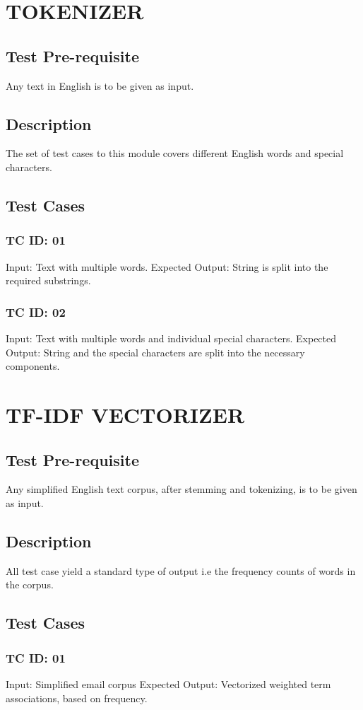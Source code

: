 \section{TOKENIZER}
\subsection{Test Pre-requisite} 
Any text in English is to be given as input. 
\subsection{Description} 
The set of test cases to this module covers different English words and special characters.
\subsection{Test Cases}
\subsubsection{TC ID: 01}
Input: Text with multiple words. 
Expected Output: String is split into the required substrings.
\subsubsection{TC ID: 02}
Input: Text with multiple words and individual special characters. 
Expected Output: String and the special characters are split into the necessary components.



\section{TF-IDF VECTORIZER}
\subsection{Test Pre-requisite}
Any simplified English text corpus, after stemming and tokenizing, is to be given as input. 
\subsection{Description} 
All test case yield a standard type of output i.e the frequency counts of words in the corpus.
\subsection{Test Cases}
\subsubsection{TC ID: 01}
Input: Simplified email corpus 
Expected Output: Vectorized weighted term associations, based on frequency.


